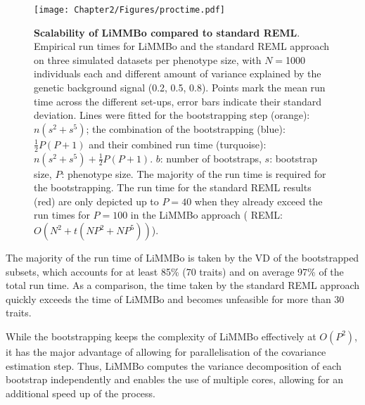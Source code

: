 \begin{figure}[H]
	\centering
	\texttt{[image: Chapter2/Figures/proctime.pdf]}
	\caption[\textbf{Scalability of LiMMBo  compared to standard REML.}]{\textbf{Scalability of LiMMBo  compared to standard REML}. Empirical run times for LiMMBo and the standard REML approach on three simulated datasets per phenotype size, with \(N=\)\num{1000} individuals each and different amount of variance explained by the genetic background signal (\num{0.2}, \num{0.5}, \num{0.8}). Points mark the mean run time across the different set-ups, error bars indicate their standard deviation. Lines were fitted for the bootstrapping step (orange): \(n(s^2 + s^5)\); the combination of the bootstrapping (blue): \(\frac{1}{2}P(P+1)\) and their combined run time (turquoise):  \(n(s^2 + s^5) + \frac{1}{2}P(P+1)\). \(b\): number of bootstraps, \(s\): bootstrap size, \(P\): phenotype size. The majority of the run time is required for the bootstrapping. The run time for the standard REML results (red) are only depicted up to \(P=40\) when they already exceed the run times for \(P=100\) in the LiMMBo approach ( REML: \(O(N^2 + t(NP^2 + NP^5))\)).}
	 	\label{fig:proctime}
\end{figure}
%
The majority of the run time of LiMMBo is taken by the VD of the bootstrapped subsets, which accounts for at least \num{85}\%  (\num{70} traits) and on average \num{97}\%  of the total run time. As a comparison, the time taken by the standard REML approach quickly exceeds the time of LiMMBo and becomes unfeasible for more than \num{30} traits. 
 
While the bootstrapping keeps the complexity of LiMMBo effectively at \(O(P^2)\), it has the major advantage of allowing for parallelisation of the covariance estimation step. Thus, LiMMBo computes the variance decomposition of each bootstrap independently and enables the use of multiple cores, allowing for an additional speed up of the process. 


